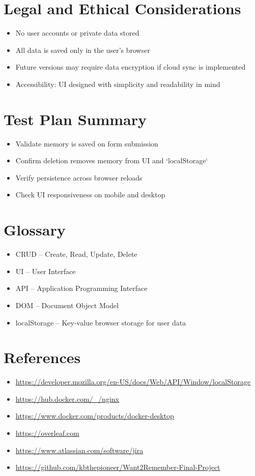 \documentclass[12pt]{article}
\begin{document}
\section{Legal and Ethical Considerations}
\begin{itemize}
    \item No user accounts or private data stored
    \item All data is saved only in the user's browser
    \item Future versions may require data encryption if cloud sync is implemented
    \item Accessibility: UI designed with simplicity and readability in mind
\end{itemize}

\section{Test Plan Summary}
\begin{itemize}
    \item Validate memory is saved on form submission
    \item Confirm deletion removes memory from UI and `localStorage`
    \item Verify persistence across browser reloads
    \item Check UI responsiveness on mobile and desktop
\end{itemize}

\section{Glossary}
\begin{itemize}
    \item CRUD – Create, Read, Update, Delete
    \item UI – User Interface
    \item API – Application Programming Interface
    \item DOM – Document Object Model
    \item localStorage – Key-value browser storage for user data
\end{itemize}

\section{References}
\begin{itemize}
  \item \url{https://developer.mozilla.org/en-US/docs/Web/API/Window/localStorage}
  \item \url{https://hub.docker.com/_/nginx}
  \item \url{https://www.docker.com/products/docker-desktop}
  \item \url{https://overleaf.com}
  \item \url{https://www.atlassian.com/software/jira}
  \item \url{https://github.com/kbthepioneer/Want2Remember-Final-Project}
\end{itemize}
\end{document}
